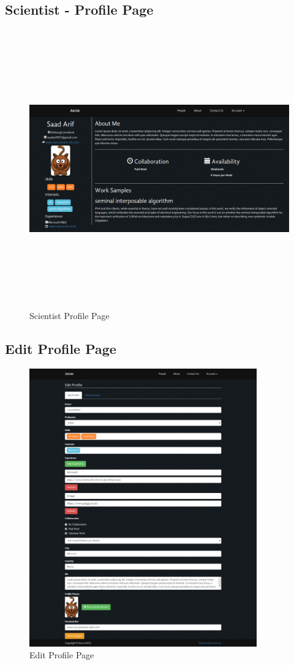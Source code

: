 \documentclass[a4paper,oneside,11pt]{report}
\begin{document}
\begin{appendices}
\subsection{Scientist - Profile Page}
\begin{figure}[!ht]
\centering
\includegraphics[width=\textwidth,height=12cm,keepaspectratio]{appendix/third-iteration-full-scientist-profile-page.png}
\caption{Scientist Profile Page}
\end{figure}

\subsection{Edit Profile Page}
\begin{figure}[!ht]
\centering
\includegraphics[width=\textwidth,height=12cm,keepaspectratio]{appendix/third-iteration-full-edit-profile-page.png}
\caption{Edit Profile Page}
\end{figure}


\end{appendices}
\end{document}
